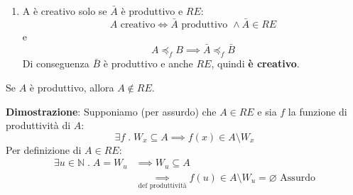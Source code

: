 \documentclass[a4paper]{article}
\begin{document}
\begin{theorem}
\begin{enumerate}
\begin{itemize}
        \item Prendiamo \( W_x \subseteq B \) e applichiamo la funzione di riduzione \( f \) a
          \( f_A(g(x)) \). La funzione \( f \) mappa elementi da \( A \) a \( B \)
          e bisogna capire se il risultato appartiene a \( B \setminus W_x \)
          o a \( W_x \).

          Supponiamo (per assurdo) che \( f(f_A(g(x))) \in W_x \), allora:
          \[
            \begin{aligned}
              f(f_A(g(x))) \in W_x &\underset{def\; \psi}{\implies} \psi(x, f_A(g(x))) = 1\\
                                   &\underset{smn}{\implies} \varphi_{g(x)}(f_A(g(x))) = \downarrow\\
                                   &\underset{def\; W_{g(x)}}{\implies} f_A(g(x)) \in W_{g(x)} \text{ Assurdo}
            \end{aligned}
          \] 
          Quindi:
          \[
            f(f_A(g(x))) \in B \setminus W_x \implies B \text{ è produttivo con }
            f' = f \circ f_A \circ g
          \] 
      \end{itemize}

    \item A è creativo solo se \( \bar{A} \) è produttivo e \( RE \):
      \[
        A \text{ creativo} \iff \bar{A} \text{ produttivo } \land \bar{A} \in RE
      \] 
       e 
      \[
        A \preceq_f B \implies \bar{A} \preceq_f \bar{B}
      \] 
      Di conseguenza \( \bar{B} \) è produttivo e anche \( RE \), quindi \textbf{è creativo}.
  \end{enumerate}
\end{theorem}

\begin{theorem}
  Se \( A \) è produttivo, allora \( A \notin RE \).

  \vspace{1em}
  \noindent
  \textbf{Dimostrazione}: Supponiamo (per assurdo) che \( A \in RE \) e sia
  \( f \) la funzione di produttività di \( A \):
  \[
    \exists f \;.\; W_x \subseteq A \implies f(x) \in A \setminus W_x
  \] 
  Per definizione di \( A \in RE \):
  \[
    \begin{aligned}
      \exists u \in \mathbb{N} \;.\; A = W_u &\implies W_u \subseteq A \\
                                             &\underset{\text{def produttività}}{\implies} f(u) \in A \setminus W_u = \varnothing \text{ Assurdo}
    \end{aligned}
  \] 
\end{theorem}
\end{document}
